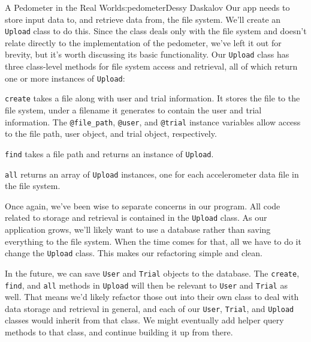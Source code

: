 \begin{aosachapter}{A Pedometer in the Real World}{s:pedometer}{Dessy Daskalov}
Our app needs to store input data to, and retrieve data from, the file
system. We'll create an \texttt{Upload} class to do this. Since the
class deals only with the file system and doesn't relate directly to the
implementation of the pedometer, we've left it out for brevity, but it's
worth discussing its basic functionality. Our \texttt{Upload} class has
three class-level methods for file system access and retrieval, all of
which return one or more instances of \texttt{Upload}:

\begin{aosaitemize}

\item
  \texttt{create} takes a file along with user and trial information. It
  stores the file to the file system, under a filename it generates to
  contain the user and trial information. The \texttt{@file\_path},
  \texttt{@user}, and \texttt{@trial} instance variables allow access to
  the file path, user object, and trial object, respectively.
\item
  \texttt{find} takes a file path and returns an instance of
  \texttt{Upload}.
\item
  \texttt{all} returns an array of \texttt{Upload} instances, one for
  each accelerometer data file in the file system.
\end{aosaitemize}

\label{separation-of-concerns-in-upload}

Once again, we've been wise to separate concerns in our program. All
code related to storage and retrieval is contained in the
\texttt{Upload} class. As our application grows, we'll likely want to
use a database rather than saving everything to the file system. When
the time comes for that, all we have to do it change the \texttt{Upload}
class. This makes our refactoring simple and clean.

In the future, we can save \texttt{User} and \texttt{Trial} objects to
the database. The \texttt{create}, \texttt{find}, and \texttt{all}
methods in \texttt{Upload} will then be relevant to \texttt{User} and
\texttt{Trial} as well. That means we'd likely refactor those out into
their own class to deal with data storage and retrieval in general, and
each of our \texttt{User}, \texttt{Trial}, and \texttt{Upload} classes
would inherit from that class. We might eventually add helper query
methods to that class, and continue building it up from there.

\label{building-a-web-application}


\end{aosachapter}
